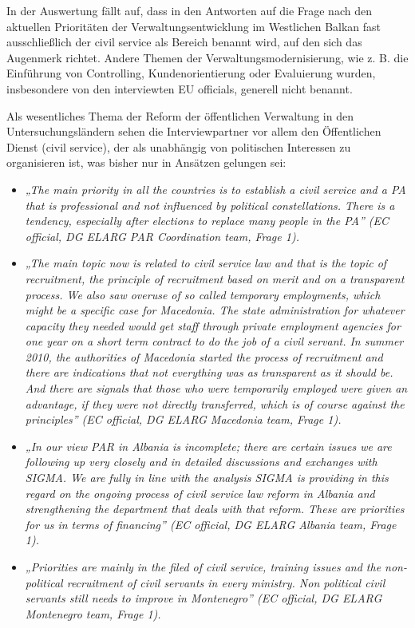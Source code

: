 In der Auswertung fällt auf, dass in den Antworten auf die Frage nach den aktuellen Prioritäten der Verwaltungsentwicklung im Westlichen Balkan fast ausschließlich der civil service als Bereich benannt wird, auf den sich das Augenmerk richtet. Andere Themen der Verwaltungsmodernisierung, wie z. B. die Einführung von Controlling, Kundenorientierung oder Evaluierung wurden, insbesondere von den interviewten EU officials, generell nicht benannt. \par
Als wesentliches Thema der Reform der öffentlichen Verwaltung in den Untersuchungsländern sehen die Interviewpartner vor allem den Öffentlichen Dienst (civil service), der als unabhängig von politischen Interessen zu organisieren ist, was bisher nur in Ansätzen gelungen sei:
\begin{itemize}[label={}]
\item \textit{„The main priority in all the countries is to establish a civil service and a PA that is professional and not influenced by political constellations. There is a tendency, especially after elections to replace many people in the PA” (EC official, DG ELARG PAR Coordination team, Frage 1). }
\item \textit{„The main topic now is related to civil service law and that is the topic of recruitment, the principle of recruitment based on merit and on a transparent process. We also saw overuse of so called temporary employments, which might be a specific case for Macedonia. The state administration for whatever capacity they needed would get staff through private employment agencies for one year on a short term contract to do the job of a civil servant. In summer 2010, the authorities of Macedonia started the process of recruitment and there are indications that not everything was as transparent as it should be. And there are signals that those who were temporarily employed were given an advantage, if they were not directly transferred, which is of course against the principles” (EC official, DG ELARG Macedonia team, Frage 1).}
\item \textit{„In our view PAR in Albania is incomplete; there are certain issues we are following up very closely and in detailed discussions and exchanges with SIGMA. We are fully in line with the analysis SIGMA is providing in this regard on the ongoing process of civil service law reform in Albania and strengthening the department that deals with that reform. These are priorities for us in terms of financing” (EC official, DG ELARG Albania team, Frage 1). }
\item \textit{„Priorities are mainly in the filed of civil service, training issues and the non-political recruitment of civil servants in every ministry. Non political civil servants still needs to improve in Montenegro” (EC official, DG ELARG Montenegro team, Frage 1).}
\end{itemize}
